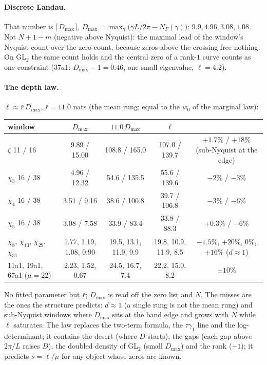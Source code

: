\documentclass[11pt]{article}
\begin{document}
\paragraph{Discrete Landau.} That number is $\lceil D_{\max}\rceil$, $D_{\max}=\max_\gamma\bigl(\gamma L/2\pi-N_\Gamma(\gamma)\bigr)$: $9.9,4.96,3.08,1.08$. Not $N+1-m$ (negative above Nyquist): the maximal lead of the window's Nyquist count over the zero count, because zeros above the crossing free nothing. On GL$_2$ the same count holds and the central zero of a rank-$1$ curve counts as one constraint ($37a1$: $D_{\max}-1=0.46$, one small eigenvalue, $\ell=4.2$).

\paragraph{The depth law.} $\ell\approx\bar r\,D_{\max}$, $\bar r=11.0$ nats (the mean rung; equal to the $w_0$ of the marginal law):
\begin{center}\small
\begin{tabular}{lcccc}\toprule
window & $D_{\max}$ & $11.0\,D_{\max}$ & $\ell$ & \\\midrule
$\zeta$ 11 / 16 & 9.89 / 15.00 & 108.8 / 165.0 & 107.0 / 139.7 & $+1.7\%$ / $+18\%$ (sub-Nyquist at the edge)\\
$\chi_3$ 16 / 38 & 4.96 / 12.32 & 54.6 / 135.5 & 55.6 / 139.6 & $-2\%$ / $-3\%$\\
$\chi_4$ 16 / 38 & 3.51 / 9.16 & 38.6 / 100.8 & 39.7 / 106.8 & $-3\%$ / $-6\%$\\
$\chi_5$ 16 / 38 & 3.08 / 7.58 & 33.9 / 83.4 & 33.8 / 88.3 & $+0.3\%$ / $-6\%$\\
$\chi_8$, $\chi_{13}$, $\chi_{29}$, $\chi_{31}$ & 1.77, 1.19, 1.08, 0.90 & 19.5, 13.1, 11.9, 9.9 & 19.8, 10.9, 11.9, 8.5 & $-1.5\%$, $+20\%$, $0\%$, $+16\%$ ($d\approx1$)\\
11a1, 19a1, 67a1 ($\mu=22$) & 2.23, 1.52, 0.67 & 24.5, 16.7, 7.4 & 22.2, 15.0, 8.2 & $\pm10\%$\\\bottomrule
\end{tabular}
\end{center}
No fitted parameter but $\bar r$; $D_{\max}$ is read off the zero list and $N$. The misses are the ones the structure predicts: $d\approx1$ (a single rung is not the mean rung) and sub-Nyquist windows where $D_{\max}$ sits at the band edge and grows with $N$ while $\ell$ saturates. The law replaces the two-term formula, the $\tau\gamma_1$ line and the log-determinant; it contains the desert (where $D$ starts), the gaps (each gap above $2\pi/L$ raises $D$), the doubled density of GL$_2$ (small $D_{\max}$) and the rank ($-1$); it predicts $s=\ell/\mu$ for any object whose zeros are known.
\end{document}
